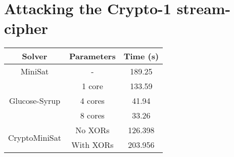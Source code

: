\section{Attacking the Crypto-1 stream-cipher}
\begin{tabular}{|c|c|c|}
	\hline
	\textbf{Solver} & \textbf{Parameters} & \textbf{Time (s)} \\
	\hline
	MiniSat & - & 189.25 \\
	\hline
	\multirow{3}{*}{Glucose-Syrup} & 1 core & 133.59 \\ \cline{2-3}
	 & 4 cores & 41.94 \\ \cline{2-3}
	 & 8 cores & 33.26 \\
	 \hline
	 
	 \multirow{2}{*}{CryptoMiniSat} & No {XORs} & 126.398 \\ \cline{2-3}
	 & With {XORs} & 203.956 \\ \cline{2-3}
	 \hline
\end{tabular}